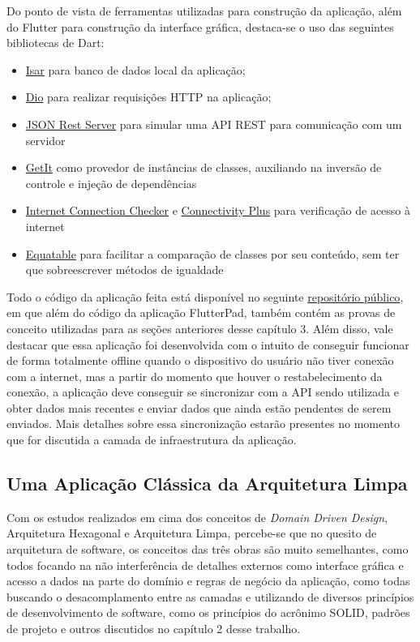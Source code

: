 \documentclass[12pt, %
openright, 
oneside, %
a4paper,    %
brazil]{facom-ufu-abntex2}
\begin{document}
Do ponto de vista de ferramentas utilizadas para construção da aplicação, além do Flutter para construção da interface gráfica, destaca-se o uso das seguintes bibliotecas de Dart:
\begin{itemize}
    \item \href{https://pub.dev/packages/isar}{Isar} para banco de dados local da aplicação;
    \item \href{https://pub.dev/packages/dio}{Dio} para realizar requisições HTTP na aplicação;
    \item \href{https://pub.dev/packages/json_rest_server}{JSON Rest Server} para simular uma API REST para comunicação com um servidor
    \item \href{https://pub.dev/packages/get_it}{GetIt} como provedor de instâncias de classes, auxiliando na inversão de controle e injeção de dependências
    \item \href{https://pub.dev/packages/internet_connection_checker}{Internet Connection Checker} e \href{https://pub.dev/packages/connectivity_plus}{Connectivity Plus} para verificação de acesso à internet
    \item \href{https://pub.dev/packages/equatable}{Equatable} para facilitar a comparação de classes por seu conteúdo, sem ter que sobreescrever métodos de igualdade
\end{itemize}

Todo o código da aplicação feita está disponível no seguinte \href{https://github.com/Alba-22/tcc}{repositório público}, em que além do código da aplicação FlutterPad, também contém as provas de conceito utilizadas para as seções anteriores desse capítulo 3. Além disso, vale destacar que essa aplicação foi desenvolvida com o intuito de conseguir funcionar de forma totalmente offline quando o dispositivo do usuário não tiver conexão com a internet, mas a partir do momento que houver o restabelecimento da conexão, a aplicação deve conseguir se sincronizar com a API sendo utilizada e obter dados mais recentes e enviar dados que ainda estão pendentes de serem enviados. Mais detalhes sobre essa sincronização estarão presentes no momento que for discutida a camada de infraestrutura da aplicação.


\subsection{Uma Aplicação Clássica da Arquitetura Limpa} \label{subsec:clean_arch}

Com os estudos realizados em cima dos conceitos de \textit{Domain Driven Design}, Arquitetura Hexagonal e Arquitetura Limpa, percebe-se que no quesito de arquitetura de software, os conceitos das três obras são muito semelhantes, como todos focando na não interferência de detalhes externos como interface gráfica e acesso a dados na parte do domínio e regras de negócio da aplicação, como todas buscando o desacomplamento entre as camadas e utilizando de diversos princípios de desenvolvimento de software, como os princípios do acrônimo SOLID, padrões de projeto e outros discutidos no capítulo 2 desse trabalho.
\end{document}

